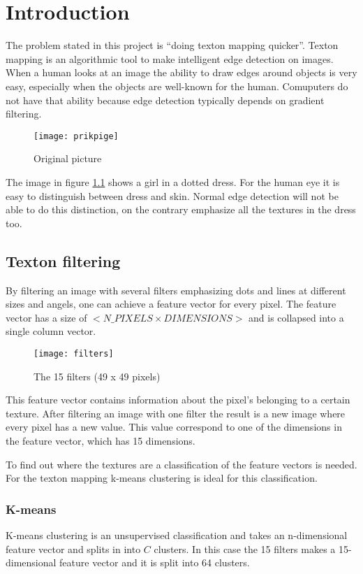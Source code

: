 \chapter{Introduction}
The problem stated in this project is ``doing texton mapping quicker''.
Texton mapping is an algorithmic tool to make intelligent edge detection on images. 
When a human looks at an image the ability to draw edges around objects is very easy, 
especially when the objects are well-known for the human. 
Comuputers do not have that ability because edge detection typically depends on gradient filtering.

\begin{figure}[H]
\centering
\texttt{[image: prikpige]}
\caption{Original picture}
\label{fig:prikpige}
\end{figure}

The image in figure \ref{fig:prikpige} shows a girl in a dotted dress. 
For the human eye it is easy to distinguish between dress and skin. 
Normal edge detection will not be able to do this distinction, 
on the contrary emphasize all the textures in the dress too.

\section{Texton filtering}
\label{sec:TextonFiltering}
By filtering an image with several filters emphasizing dots and lines at different sizes and angels, 
one can achieve a feature vector for every pixel. 
The feature vector has a size of $<N\_PIXELS\times DIMENSIONS>$ and is collapsed into a single column vector. 

\begin{figure}[H]
\centering
\texttt{[image: filters]}
\caption{The 15 filters (49 x 49 pixels)}
\label{fig:filtre}
\end{figure}


This feature vector contains information about the pixel's belonging to a certain texture. 
After filtering an image with one filter the result is a new image where every pixel has a new value. 
This value correspond to one of the dimensions in the feature vector, which has 15 dimensions.

To find out where the textures are a classification of the feature vectors is needed. 
For the texton mapping k-means clustering is ideal for this classification.


\subsection{K-means}
\label{sec:Kmeans}
K-means clustering is an unsupervised classification and takes an n-dimensional feature vector and splits in into $C$ clusters. 
In this case the 15 filters makes a 15-dimensional feature vector and it is split into 64 clusters. 

